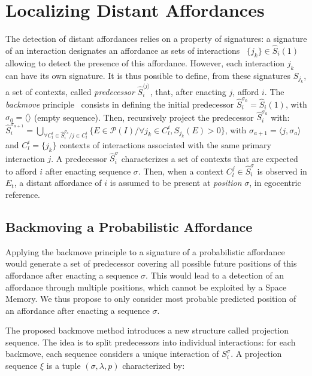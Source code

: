 \documentclass[conference]{IEEEtran}
\makeatletter
\let\cite\relax
\DeclareRobustCommand{\cite}{%
	\let\new@cite@pre\@gobble
	\@ifnextchar[\new@cite{\@citex[]}}
\def\new@cite[#1]{\@ifnextchar[{\new@citea{#1}}{\@citex[#1]}}
\def\new@citea#1{\def\new@cite@pre{#1}\@citex}
\makeatother
\begin{document}
\section{Localizing Distant Affordances}\label{localize}


The detection of distant affordances relies on a property of signatures: a signature of an interaction designates an affordance as sets of interactions ~$\{j_k\} \in \hat{S}_i(1)$ allowing to detect the presence of this affordance.
However, each interaction $j_k$ can have its own signature. 
It is thus possible to define, from these signatures $S_{j_k}$, a set of contexts, called \textit{predecessor} $\hat{S}_i^{\langle j\rangle}$, that, after enacting $j$, afford $i$.
The \textit{backmove} principle~\cite{gay:space} consists in defining the initial predecessor $\hat{S}_i^{\sigma_0}=\hat{S}_i(1)$, with $\sigma_0=\langle\rangle$ (empty sequence).
Then, recursively project the predecessor $\hat{S}_i^{\sigma_a}$ with:
$\hat{S}_i^{\sigma_{a+1}}\!=\!\bigcup_{\forall C_l^i \in \hat{S}_i^{\sigma_a} / j \in C_l^i} \{E \in \mathcal{P}(I) / \forall j_k \in C_l^i, S_{j_k}(E)\!>\!0\}$,
with $\sigma_{a+1}=\langle j,\sigma_a \rangle$ and $C_l^i=\{j_k\}$ contexts of interactions associated with the same primary interaction $j$.
A predecessor $\hat{S}_i^\sigma$ characterizes a set of contexts that are expected to afford $i$ after enacting sequence $\sigma$.
Then, when a context $C_l^j \in \hat{S}_i^\sigma$ is observed in $E_t$, a distant affordance of $i$ is assumed to be present at \textit{position} $\sigma$, in egocentric reference.


\subsection{Backmoving a Probabilistic Affordance}\label{backmove}

Applying the backmove principle to a signature of a probabilistic affordance would generate a set of predecessor covering all possible future positions of this affordance after enacting a sequence $\sigma$. This would lead to a detection of an affordance through multiple positions, which cannot be exploited by a Space Memory.
We thus propose to only consider most probable predicted position of an affordance after enacting a sequence $\sigma$.

The proposed backmove method introduces a new structure called projection sequence. The idea is to split predecessors into individual interactions: for each backmove, each sequence considers a unique interaction of $S_i^{\sigma}$.
A projection sequence $\xi$ is a tuple $(\sigma,\lambda,p)$ characterized by:
\end{document}
